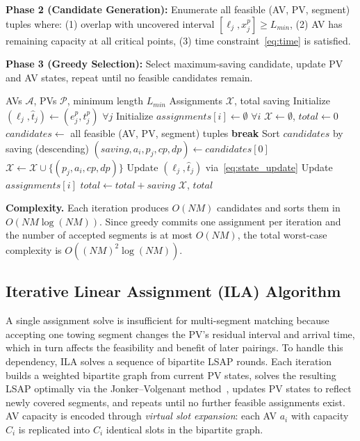 \documentclass[conference]{IEEEtran}
\begin{document}
\textbf{Phase 2 (Candidate Generation):} Enumerate all feasible (AV, PV, segment) tuples where: (1) overlap with uncovered interval $[\ell_j, x_j^p] \geq L_{min}$, (2) AV has remaining capacity at all critical points, (3) time constraint~\eqref{eq:time} is satisfied.

\textbf{Phase 3 (Greedy Selection):} Select maximum-saving candidate, update PV and AV states, repeat until no feasible candidates remain.

\begin{algorithm}[htbp]
\caption{Greedy Multi-AV Platoon Matching}
\label{alg:greedy}
\begin{algorithmic}[1]
\REQUIRE AVs $\mathcal{A}$, PVs $\mathcal{P}$, minimum length $L_{min}$
\ENSURE Assignments $\mathcal{X}$, total saving
\STATE Initialize $(\ell_j, \hat{t}_j) \leftarrow (e_j^p, t_j^p)$ $\forall j$
\STATE Initialize $assignments[i] \leftarrow \emptyset$ $\forall i$
\STATE $\mathcal{X} \leftarrow \emptyset$, $total \leftarrow 0$
\REPEAT
    \STATE $candidates \leftarrow$ all feasible (AV, PV, segment) tuples
        \STATE \textbf{break}
    \ENDIF
    \STATE Sort $candidates$ by saving (descending)
    \STATE $(saving, a_i, p_j, cp, dp) \leftarrow candidates[0]$
    \STATE $\mathcal{X} \leftarrow \mathcal{X} \cup \{(p_j, a_i, cp, dp)\}$
    \STATE Update $(\ell_j, \hat{t}_j)$ via~\eqref{eq:state_update}
    \STATE Update $assignments[i]$
    \STATE $total \leftarrow total + saving$
\RETURN $\mathcal{X}$, $total$
\end{algorithmic}
\end{algorithm}

\textbf{Complexity.} Each iteration produces $O(NM)$ candidates and sorts them in $O(NM \log(NM))$. Since greedy commits one assignment per iteration and the number of accepted segments is at most $O(NM)$, the total worst-case complexity is $O((NM)^2 \log(NM))$.

\subsection{Iterative Linear Assignment (ILA) Algorithm}
\label{sec:ila}

A single assignment solve is insufficient for multi-segment matching because accepting one towing segment changes the PV’s residual interval and arrival time, which in turn affects the feasibility and benefit of later pairings. To handle this dependency, ILA solves a sequence of bipartite LSAP rounds. Each iteration builds a weighted bipartite graph from current PV states, solves the resulting LSAP optimally via the Jonker--Volgenant method~\cite{kuhn1955hungarian,munkres1957algorithms,burkard2012assignment}, updates PV states to reflect newly covered segments, and repeats until no further feasible assignments exist. AV capacity is encoded through \textit{virtual slot expansion}: each AV $a_i$ with capacity $C_i$ is replicated into $C_i$ identical slots in the bipartite graph.
\end{document}
